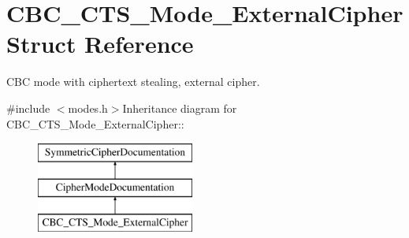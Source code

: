 \hypertarget{struct_c_b_c___c_t_s___mode___external_cipher}{
\section{CBC\_\-CTS\_\-Mode\_\-ExternalCipher Struct Reference}
\label{struct_c_b_c___c_t_s___mode___external_cipher}
}


CBC mode with ciphertext stealing, external cipher.  


{\ttfamily \#include $<$modes.h$>$}Inheritance diagram for CBC\_\-CTS\_\-Mode\_\-ExternalCipher::\begin{figure}[H]
\begin{center}
\leavevmode
\includegraphics[height=3cm]{struct_c_b_c___c_t_s___mode___external_cipher}
\end{center}
\end{figure}
